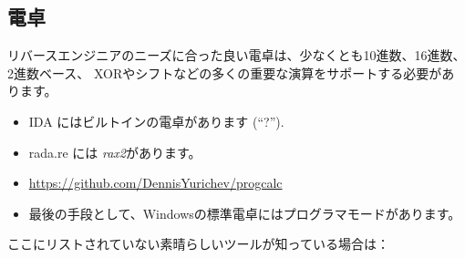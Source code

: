 \subsection{電卓}

リバースエンジニアのニーズに合った良い電卓は、少なくとも10進数、16進数、2進数ベース、
XORやシフトなどの多くの重要な演算をサポートする必要があります。

\begin{itemize}

\item IDA にはビルトインの電卓があります (``?'').

\item rada.re には \emph{rax2}があります。

\item \url{https://github.com/DennisYurichev/progcalc}

\item 最後の手段として、Windowsの標準電卓にはプログラマモードがあります。

\end{itemize}


ここにリストされていない素晴らしいツールが知っている場合は：\\
\TT{\EMAIL}

